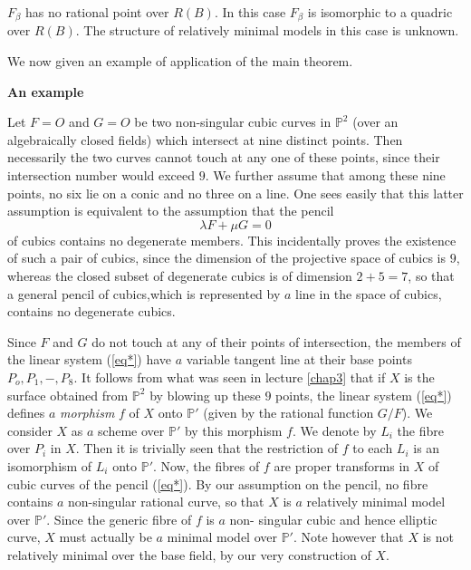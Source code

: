 \begin{case}%
  $F_ \beta$ has no rational point over $R(B)$. In this case $F_
  \beta$ is isomorphic to a quadric over $R(B)$. The structure of
  relatively minimal models in this case is unknown. 
\end{case} 
 
We now given an example of application of the main theorem.
 
\medskip
\noindent
\textbf{An example}
 
Let $F=O$ and $G=O$ be two non-singular cubic curves in $\mathbb{P}^2$
(over an algebraically closed fields) which intersect at nine distinct
points. Then necessarily the two curves cannot touch at any one of
these points, since their intersection number would exceed $9$. We
further assume that among these nine points, no six lie on a conic and
no three on a line. One sees easily that this latter assumption is
equivalent to the assumption that the pencil 
 \begin{equation}
\lambda F +\mu G=0 \tag*{$(*)$}\label{eq*}
\end{equation}   
of cubics contains no degenerate members. This incidentally proves the
existence of such a pair of cubics, since the dimension of the
projective space of cubics is $9$, whereas the closed subset of
degenerate cubics is of dimension $2+5=7$, so that a general pencil of
cubics,\pageoriginale which is represented by $a$ line in the space of cubics,
contains no degenerate cubics. 

Since $F$ and $ G$ do not touch at any of their points of
intersection, the members of  the linear system (\ref{eq*}) have $a$
variable tangent 
line at their base points $ P_o, P_1, -, P_8$. It follows from what
was seen in lecture \ref{chap3} that if $X$ is the surface obtained
from $\mathbb{P}^2$ by blowing up these $9$ points, the linear system
(\ref{eq*}) 
defines $a$ \textit{morphism} $f$ of $X$ onto $\mathbb{P}'$ (given by
the rational function $G/F$). We consider $X$ as $a$ scheme over
$\mathbb{P}'$ by this morphism $f$. We denote by $L_i$ the fibre over
$P_i$ in $X$. Then it is trivially seen that the restriction of $f$
to each $L_i$ is an isomorphism of $L_i$ onto $\mathbb{P}'$. Now, the
fibres of $f$ are proper transforms in $X$ of cubic curves of the
pencil (\ref{eq*}). By our assumption on the pencil, no fibre contains $a$
non-singular rational curve, so that $X$ is $a$ relatively minimal
model over $\mathbb{P}'$. Since the generic fibre of $f$ is $a$ non-
singular cubic and hence elliptic curve, $X$ must actually be $a$
minimal model over  $\mathbb{P}'$.  Note however that $X$ is not
relatively minimal over the base field, by our very construction of
$X$. 


